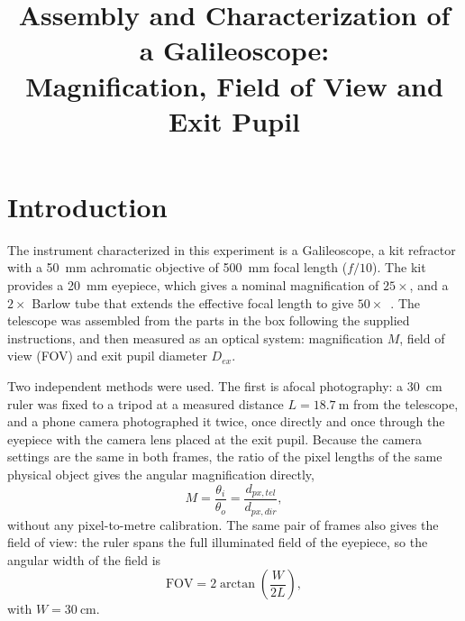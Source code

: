 \documentclass[conference]{IEEEtran}
\begin{document}
\title{Assembly and Characterization of a Galileoscope:\\
Magnification, Field of View and Exit Pupil}

\author{
}

\maketitle

\section{Introduction}

The instrument characterized in this experiment is a Galileoscope, a kit
refractor with a \SI{50}{\milli\meter} achromatic objective of
\SI{500}{\milli\meter} focal length ($f/10$). The kit provides a
\SI{20}{\milli\meter} eyepiece, which gives a nominal magnification of
$25\times$, and a $2\times$ Barlow tube that extends the effective
focal length to give $50\times$~\cite{galileoscope}. The telescope was
assembled from the parts in the box following the supplied instructions, and
then measured as an optical system: magnification $M$, field of view (FOV) and
exit pupil diameter $D_{ex}$.

Two independent methods were used. The first is afocal photography: a
\SI{30}{\centi\meter} ruler was fixed to a tripod at a measured distance
$L = \SI{18.7}{\meter}$ from the telescope, and a phone camera photographed it
twice, once directly and once through the eyepiece with the camera lens placed
at the exit pupil. Because the camera settings are the same in both frames, the
ratio of the pixel lengths of the same physical object gives the angular
magnification directly,
\begin{equation}
M = \frac{\theta_i}{\theta_o} = \frac{d_{px,tel}}{d_{px,dir}} ,
\label{eq:M}
\end{equation}
without any pixel-to-metre calibration. The same pair of frames also gives the
field of view: the ruler spans the full illuminated field of the eyepiece, so
the angular width of the field is
\begin{equation}
\mathrm{FOV} = 2\arctan\!\left(\frac{W}{2L}\right),
\label{eq:fov}
\end{equation}
with $W = \SI{30}{\centi\meter}$.
\end{document}
